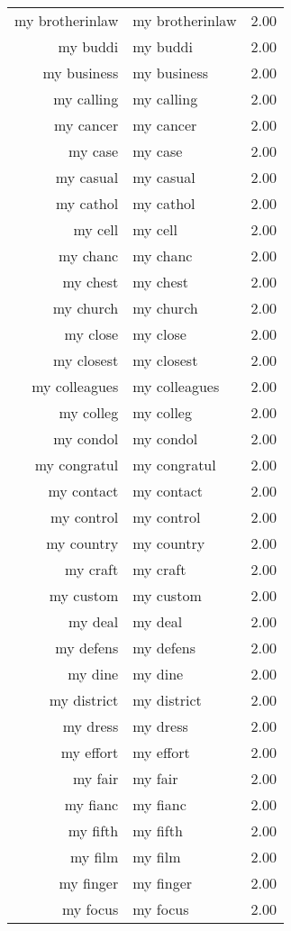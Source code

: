 \begin{table}[ht]
\begin{tabular}{rlr}
  my brotherinlaw & my brotherinlaw & 2.00 \\ 
  my buddi & my buddi & 2.00 \\ 
  my business & my business & 2.00 \\ 
  my calling & my calling & 2.00 \\ 
  my cancer & my cancer & 2.00 \\ 
  my case & my case & 2.00 \\ 
  my casual & my casual & 2.00 \\ 
  my cathol & my cathol & 2.00 \\ 
  my cell & my cell & 2.00 \\ 
  my chanc & my chanc & 2.00 \\ 
  my chest & my chest & 2.00 \\ 
  my church & my church & 2.00 \\ 
  my close & my close & 2.00 \\ 
  my closest & my closest & 2.00 \\ 
  my colleagues & my colleagues & 2.00 \\ 
  my colleg & my colleg & 2.00 \\ 
  my condol & my condol & 2.00 \\ 
  my congratul & my congratul & 2.00 \\ 
  my contact & my contact & 2.00 \\ 
  my control & my control & 2.00 \\ 
  my country & my country & 2.00 \\ 
  my craft & my craft & 2.00 \\ 
  my custom & my custom & 2.00 \\ 
  my deal & my deal & 2.00 \\ 
  my defens & my defens & 2.00 \\ 
  my dine & my dine & 2.00 \\ 
  my district & my district & 2.00 \\ 
  my dress & my dress & 2.00 \\ 
  my effort & my effort & 2.00 \\ 
  my fair & my fair & 2.00 \\ 
  my fianc & my fianc & 2.00 \\ 
  my fifth & my fifth & 2.00 \\ 
  my film & my film & 2.00 \\ 
  my finger & my finger & 2.00 \\ 
  my focus & my focus & 2.00 \\ 

\end{tabular}
\end{table}
